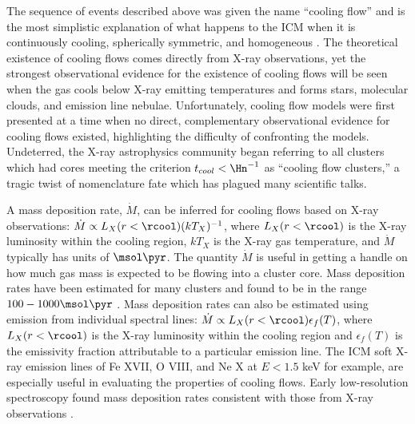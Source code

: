 The sequence of events described above was given the name ``cooling
flow'' \citep{fabian77, cowie77, mathews78} and is the most simplistic
explanation of what happens to the ICM when it is continuously
cooling, spherically symmetric, and homogeneous \citep[see][for
reviews of cool gas in cluster cores]{fabiancfreview, cfreview,
2004cgpc.symp..143D}. The theoretical existence of cooling flows comes
directly from X-ray observations, yet the strongest observational
evidence for the existence of cooling flows will be seen when the gas
cools below X-ray emitting temperatures and forms stars, molecular
clouds, and emission line nebulae. Unfortunately, cooling flow models
were first presented at a time when no direct, complementary
observational evidence for cooling flows existed, highlighting the
difficulty of confronting the models. Undeterred, the X-ray
astrophysics community began referring to all clusters which had cores
meeting the criterion $t_{cool} < \Hn^{-1}$ as ``cooling flow
clusters,'' a tragic twist of nomenclature fate which has plagued many
scientific talks.

A mass deposition rate, $\dot{M}$, can be inferred for cooling flows
based on X-ray observations: $\dot{M} \propto
L_{X}(r<\rcool)(kT_X)^{-1}$, where $L_{X}(r<\rcool)$ is the X-ray
luminosity within the cooling region, $kT_X$ is the X-ray gas
temperature, and $\dot{M}$ typically has units of $\msol\pyr$. The
quantity $\dot{M}$ is useful in getting a handle on how much gas mass
is expected to be flowing into a cluster core. Mass deposition rates
have been estimated for many clusters and found to be in the range
$100-1000 \msol \pyr$ \citep{1984Natur.310..733F, white97,
  1998MNRAS.298..416P}. Mass deposition rates can also be estimated
using emission from individual spectral lines: $\dot{M} \propto
L_{X}(r<\rcool) \epsilon_f(T)$, where $L_{X}(r<\rcool)$ is the X-ray
luminosity within the cooling region and $\epsilon_f(T)$ is the
emissivity fraction attributable to a particular emission line. The
ICM soft X-ray emission lines of Fe XVII, O VIII, and Ne X at $E <
1.5$ keV for example, are especially useful in evaluating the
properties of cooling flows. Early low-resolution spectroscopy found
mass deposition rates consistent with those from X-ray observations
\citep[\eg][]{1982ApJ...262...33C}.

